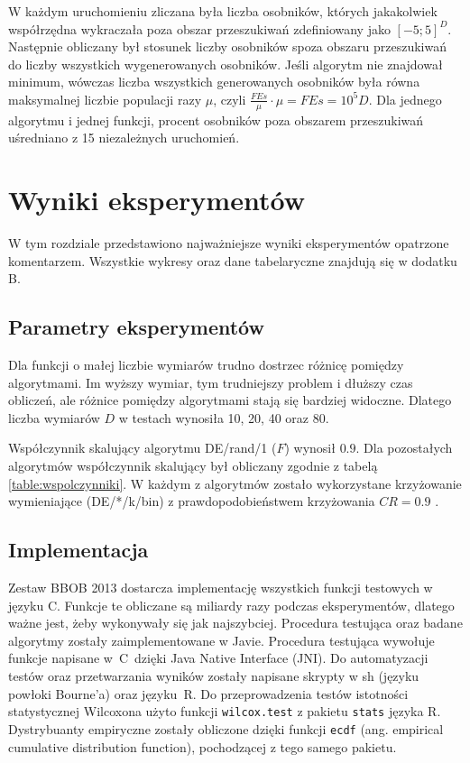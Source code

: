 \documentclass[a4paper,onecolumn,oneside,12pt,wide,floatssmall]{mwrep}
\theoremstyle{definition}
\theoremstyle{plain}%
\theoremstyle{remark}
\begin{document}
W każdym uruchomieniu zliczana była liczba osobników, których jakakolwiek współrzędna wykraczała poza
obszar przeszukiwań zdefiniowany jako $[-5; 5]^D$. Następnie obliczany był stosunek liczby 
osobników spoza obszaru przeszukiwań do liczby wszystkich wygenerowanych osobników. Jeśli algorytm
nie znajdował minimum, wówczas liczba wszystkich generowanych osobników była równa maksymalnej liczbie
populacji razy $\mu$, czyli $\frac{FEs}{\mu} \cdot \mu = FEs = 10^5D$. 
Dla jednego algorytmu i jednej funkcji, procent osobników
poza obszarem przeszukiwań uśredniano z 15 niezależnych uruchomień.

\chapter{Wyniki eksperymentów}

W tym rozdziale przedstawiono najważniejsze wyniki eksperymentów opatrzone komentarzem.
Wszystkie wykresy oraz dane tabelaryczne znajdują się w dodatku B.

\section{Parametry eksperymentów}

Dla funkcji o małej liczbie wymiarów trudno dostrzec różnicę pomiędzy algorytmami. Im wyższy wymiar,
tym trudniejszy problem i dłuższy czas obliczeń, ale różnice pomiędzy algorytmami stają się bardziej 
widoczne. Dlatego liczba wymiarów $D$ w testach wynosiła 10, 20, 40 oraz 80. 

Współczynnik skalujący algorytmu DE/rand/1 ($F$) wynosił $0.9$. 
Dla pozostałych algorytmów współczynnik skalujący był obliczany zgodnie z tabelą
\ref{table:wspolczynniki}.
W każdym z algorytmów zostało wykorzystane krzyżowanie wymieniające (DE/*/k/bin) z
prawdopodobieństwem krzyżowania $CR = 0.9$ \cite{ronkkonen}.

\section{Implementacja}

Zestaw BBOB 2013 dostarcza implementację wszystkich funkcji testowych w języku C. Funkcje te obliczane
są miliardy razy podczas eksperymentów, dlatego ważne jest, żeby wykonywały się jak najszybciej.
Procedura testująca oraz badane algorytmy zostały zaimplementowane w 
Javie. Procedura testująca wywołuje funkcje napisane w~C~dzięki Java Native Interface (JNI).
Do automatyzacji testów oraz przetwarzania wyników zostały napisane skrypty w sh 
(języku powłoki Bourne'a) oraz języku~R. Do przeprowadzenia testów istotności statystycznej Wilcoxona 
użyto funkcji \texttt{wilcox.test} z pakietu \texttt{stats} języka R. Dystrybuanty empiryczne
zostały obliczone dzięki funkcji \texttt{ecdf} (ang. empirical cumulative distribution function),
pochodzącej z tego samego pakietu.
\end{document}
